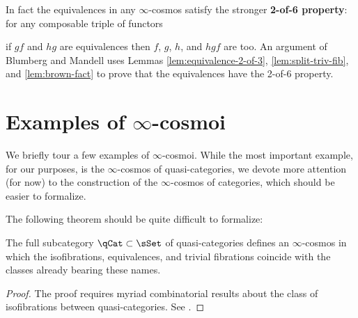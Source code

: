 \begin{rmk}\label{rmk:2-of-6}
In fact the equivalences in any $\infty$-cosmos satisfy the stronger \textbf{2-of-6 property}: for any composable triple of functors
\begin{center}
\end{center}
if $gf$ and $hg$ are equivalences then $f$, $g$, $h$, and $hgf$ are too. An argument of Blumberg and Mandell \cite[6.4]{BlumbergMandell:2011ak} uses Lemmas \ref{lem:equivalence-2-of-3}, \ref{lem:split-triv-fib}, and \ref{lem:brown-fact} to prove that the equivalences have the 2-of-6 property.
\end{rmk}


\section{Examples of \texorpdfstring{$\infty$}{infinity}-cosmoi}\label{sec:examples}

We briefly tour a few examples of $\infty$-cosmoi. While the most important example, for our purposes, is the $\infty$-cosmos of quasi-categories, we devote more attention (for now) to the construction of the $\infty$-cosmos of categories, which should be easier to formalize.

The following theorem should be quite difficult to formalize:

\begin{proposition}\label{prop:qcat-cosmos}
  The full subcategory $\qCat\subset\sSet$ of quasi-categories defines an $\infty$-cosmos in which the isofibrations, equivalences, and trivial fibrations coincide with the classes  already bearing these names.
\end{proposition}
\begin{proof}
 The proof requires myriad combinatorial results about the class of isofibrations between quasi-categories. See \cite[\S D]{RiehlVerity:2022eo}.
\end{proof}


